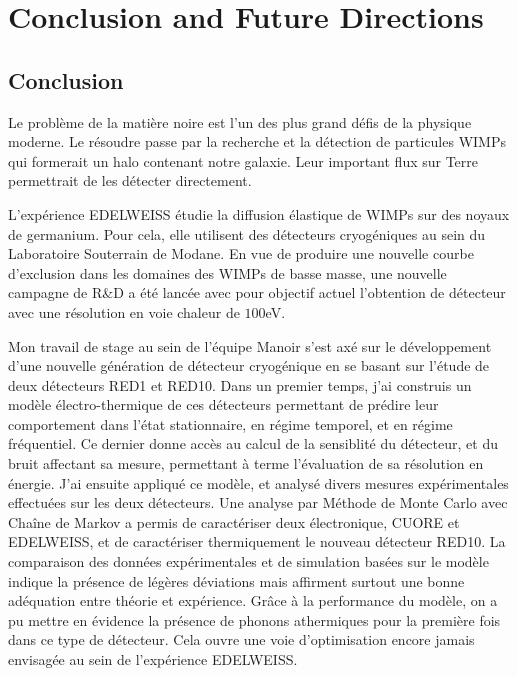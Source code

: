 
\chapter{Conclusion and Future Directions} %

\label{ChapterConclusion} %




\section*{Conclusion}

Le problème de la matière noire est l'un des plus grand défis de la physique moderne. Le résoudre passe par la recherche et la détection de particules WIMPs qui formerait un halo contenant notre galaxie. Leur important flux sur Terre permettrait de les détecter directement. 

L'expérience EDELWEISS étudie la diffusion élastique de WIMPs sur des noyaux de germanium. Pour cela, elle utilisent des détecteurs cryogéniques au sein du Laboratoire Souterrain de Modane. En vue de produire une nouvelle courbe d'exclusion dans les domaines des WIMPs de basse masse, une nouvelle campagne de R\&D a été lancée avec pour objectif actuel l'obtention de détecteur avec une résolution en voie chaleur de $100$eV.

Mon travail de stage au sein de l'équipe Manoir s'est axé sur le développement d'une nouvelle génération de détecteur cryogénique en se basant sur l'étude de deux détecteurs RED1 et RED10.  Dans un premier temps, j'ai construis un modèle électro-thermique de ces détecteurs permettant de prédire leur comportement dans l'état stationnaire, en régime temporel, et en régime fréquentiel. Ce dernier donne accès au calcul de la sensiblité du détecteur, et du bruit affectant sa mesure, permettant à terme l'évaluation de sa résolution en énergie. J'ai ensuite appliqué ce modèle, et analysé divers mesures expérimentales effectuées sur les deux détecteurs. Une analyse par Méthode de Monte Carlo avec Chaîne de Markov a permis de caractériser deux électronique, CUORE et EDELWEISS, et de caractériser thermiquement le nouveau détecteur RED10. La comparaison des données expérimentales et de simulation basées sur le modèle indique la présence de légères déviations mais affirment surtout une bonne adéquation entre théorie et expérience. Grâce à la performance du modèle, on a pu mettre en évidence la présence de phonons athermiques pour la première fois dans ce type de détecteur. Cela ouvre une voie d'optimisation encore jamais envisagée au sein de l'expérience EDELWEISS.

